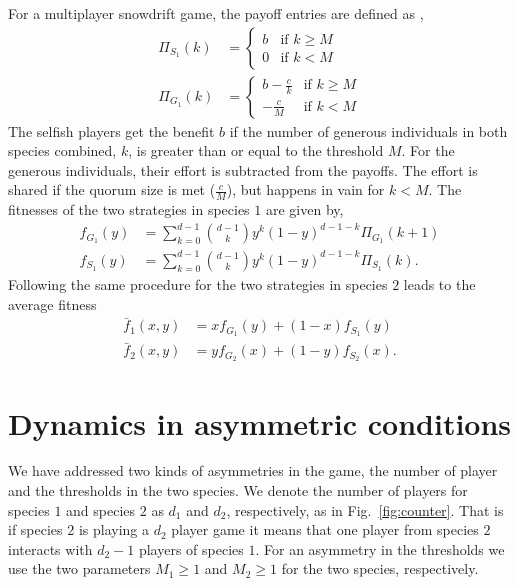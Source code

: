 \documentclass{pnastwo}
\begin{document}
\begin{article}
For a multiplayer snowdrift game, the payoff entries are defined as \cite{souza:2009aa},
\begin{align}
\Pi_{S_1} (k) & = \begin{cases} b & \textrm{if } k \geq M \\ 0 & \textrm{if } k < M \end{cases}
\\
\Pi_{G_1} (k) & = \begin{cases} b-\frac{c}{k} & \textrm{if } k \geq M \\  -\frac{c}{M} & \textrm{if } k < M \end{cases}
\end{align}
%
The selfish players get the benefit $b$ if the number of generous individuals in both species combined, $k$, is greater than or equal to the threshold $M$.
For the generous individuals, their effort is subtracted from the payoffs.
The effort is shared if the quorum size is met ($\frac{c}{M}$), but happens in vain for $k<M$. 
The fitnesses of the two strategies in species $1$ are given by,
%
\begin{align}
f_{G_1} (y) &= \sum_{k=0}^{d-1} \binom{d-1}{k}y^k (1-y)^{d-1-k} \Pi_{G_1}(k+1) \\
f_{S_1} (y) &= \sum_{k=0}^{d-1} \binom{d-1}{k}y^k (1-y)^{d-1-k} \Pi_{S_1}(k).
\label{fiteqs}
\end{align}
%
Following the same procedure for the two strategies in species $2$ leads to the average fitness
%
\begin{align}
\bar{f}_1 (x,y) &= x f_{G_1} (y)+(1-x) f_ {S_1}(y)\\
\bar{f}_2 (x,y) &= y f_{G_2} (x)+(1-y) f_{S_2}(x).
\label{avgfiteqs}
\end{align}
%

\section{Dynamics in asymmetric conditions}

We have addressed two kinds of asymmetries in the game, the number of player and the thresholds in the two species.
We denote the number of players for species $1$ and species $2$ as $d_1$ and $d_2$, respectively, as in Fig.\ \ref{fig:counter}.
That is if species $2$ is playing a $d_2$ player game it means that one player from species $2$ interacts with $d_2-1$ players of species $1$.
For an asymmetry in the thresholds we use the two parameters $M_1\geq1$ and $M_2\geq1$ for the two species, respectively.


\end{article}
\end{document}
